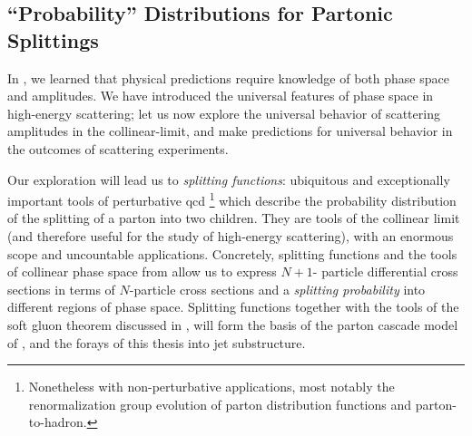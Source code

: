 


\subsection{\texorpdfstring{``Probability''}{"Probability"} Distributions for Partonic Splittings}
\label{sec:splitting-functions}
In , we learned that physical predictions require knowledge of both phase space and amplitudes.
%
We have introduced the universal features of phase space in high-energy scattering;
%
let us now explore the universal behavior of scattering amplitudes in the \gls{collinear-limit}, and make predictions for universal behavior in the outcomes of scattering experiments.


Our exploration will lead us to \textit{splitting functions}:
%
ubiquitous and exceptionally important tools of perturbative \gls{qcd}%
\footnote{
    Nonetheless with non-perturbative applications, most notably the renormalization group evolution of parton distribution functions and \gls{parton-to-hadron}.
}
%
which describe the probability distribution of the splitting of a parton into two children.
%
They are tools of the collinear limit (and therefore useful for the study of high-energy scattering), with an enormous scope and uncountable applications.
%
Concretely, splitting functions and the tools of collinear phase space from  allow us to express \(N+1\)- particle differential cross sections in terms of \(N\)-particle cross sections and a \textit{splitting probability} into different regions of phase space.
%
Splitting functions together with the tools of the soft gluon theorem discussed in , will form the basis of the parton cascade model of , and the forays of this thesis into jet substructure.


